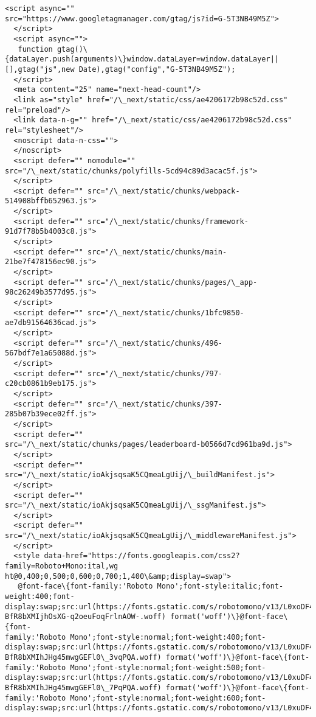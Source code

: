 \documentclass[11pt]{article}
\begin{document}
\begin{Verbatim}[commandchars=\\\{\}]
  <script async=""
src="https://www.googletagmanager.com/gtag/js?id=G-5T3NB49M5Z">
  </script>
  <script async="">
   function gtag()\{dataLayer.push(arguments)\}window.dataLayer=window.dataLayer||
[],gtag("js",new Date),gtag("config","G-5T3NB49M5Z");
  </script>
  <meta content="25" name="next-head-count"/>
  <link as="style" href="/\_next/static/css/ae4206172b98c52d.css" rel="preload"/>
  <link data-n-g="" href="/\_next/static/css/ae4206172b98c52d.css"
rel="stylesheet"/>
  <noscript data-n-css="">
  </noscript>
  <script defer="" nomodule=""
src="/\_next/static/chunks/polyfills-5cd94c89d3acac5f.js">
  </script>
  <script defer="" src="/\_next/static/chunks/webpack-514908bffb652963.js">
  </script>
  <script defer="" src="/\_next/static/chunks/framework-91d7f78b5b4003c8.js">
  </script>
  <script defer="" src="/\_next/static/chunks/main-21be7f478156ec90.js">
  </script>
  <script defer="" src="/\_next/static/chunks/pages/\_app-98c26249b3577d95.js">
  </script>
  <script defer="" src="/\_next/static/chunks/1bfc9850-ae7db91564636cad.js">
  </script>
  <script defer="" src="/\_next/static/chunks/496-567bdf7e1a65088d.js">
  </script>
  <script defer="" src="/\_next/static/chunks/797-c20cb0861b9eb175.js">
  </script>
  <script defer="" src="/\_next/static/chunks/397-285b07b39ece02ff.js">
  </script>
  <script defer=""
src="/\_next/static/chunks/pages/leaderboard-b0566d7cd961ba9d.js">
  </script>
  <script defer="" src="/\_next/static/ioAkjsqsaK5CQmeaLgUij/\_buildManifest.js">
  </script>
  <script defer="" src="/\_next/static/ioAkjsqsaK5CQmeaLgUij/\_ssgManifest.js">
  </script>
  <script defer=""
src="/\_next/static/ioAkjsqsaK5CQmeaLgUij/\_middlewareManifest.js">
  </script>
  <style data-href="https://fonts.googleapis.com/css2?family=Roboto+Mono:ital,wg
ht@0,400;0,500;0,600;0,700;1,400\&amp;display=swap">
   @font-face\{font-family:'Roboto Mono';font-style:italic;font-weight:400;font-
display:swap;src:url(https://fonts.gstatic.com/s/robotomono/v13/L0xoDF4xlVMF-
BfR8bXMIjhOsXG-q2oeuFoqFrlnAOW-.woff) format('woff')\}@font-face\{font-
family:'Roboto Mono';font-style:normal;font-weight:400;font-
display:swap;src:url(https://fonts.gstatic.com/s/robotomono/v13/L0xuDF4xlVMF-
BfR8bXMIhJHg45mwgGEFl0\_3vqPQA.woff) format('woff')\}@font-face\{font-
family:'Roboto Mono';font-style:normal;font-weight:500;font-
display:swap;src:url(https://fonts.gstatic.com/s/robotomono/v13/L0xuDF4xlVMF-
BfR8bXMIhJHg45mwgGEFl0\_7PqPQA.woff) format('woff')\}@font-face\{font-
family:'Roboto Mono';font-style:normal;font-weight:600;font-
display:swap;src:url(https://fonts.gstatic.com/s/robotomono/v13/L0xuDF4xlVMF-

\end{Verbatim}
\end{document}
